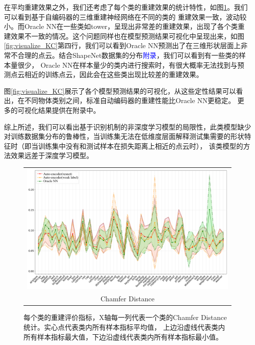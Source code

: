 \documentclass[bachelor, nocolorlinks, printoneside]{seuthesis} %
\newcommand\TODO[1]{\textcolor{blue}{#1}}
\begin{document}
\begin{Main}
在平均重建效果之外，我们还考虑了每个类的重建效果的统计特性，如图\ref{fig:metric_per_class}。我们可以看到基于自编码器的三维重建神经网络在不同的类的
重建效果一致，波动较小。而Oracle NN在一些类如tower，呈现出非常差的重建效果，出现了各个类重建效果不一致的情况。这个问题同样也在模型预测结果可视化中呈现出来，如图
\ref{fig:visualize_KC}第四行，我们可以看到Oracle NN预测出了在三维形状层面上非常不合理的点云。结合ShapeNet数据集的分布\TODO{附录}，我们可以看到有一些类的样本量很少，
Oracle NN在样本量少的类内进行搜索时，有很大概率无法找到与预测点云相近的训练点云，因此会在这些类出现比较差的重建效果。

图\ref{fig:visualize_KC}展示了各个模型预测结果的可视化，从这些定性结果可以看出，在不同物体类别之间，标准自动编码器的重建性能比Oracle NN更稳定。
更多的可视化结果提供在附录中。

综上所述，我们可以看出基于识别机制的非深度学习模型的局限性，此类模型缺少对训练数据集分布的鲁棒性，当训练集无法在低维度层面解释测试集需要的形状特征时（即当训练集中没有和测试样本在损失距离上相近的点云时），
该类模型的方法效果远差于深度学习模型。

\begin{figure}
\centering
\begin{tabular}{c@{}}
\includegraphics[width=0.99\columnwidth]{figs/CD_per_shape_roman.png} \\
Chamfer Distance \\
\end{tabular}
\caption{每个类的重建评价指标，X轴每一列代表一个类的Chamfer Distance统计。实心点代表类内所有样本指标平均值，
上边沿虚线代表类内所有样本指标最大值，下边沿虚线代表类内所有样本指标最小值。}
\label{fig:metric_per_class}
\end{figure}


\end{Main}
\end{document}
